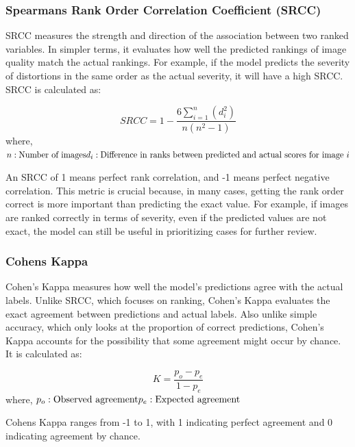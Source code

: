 \subsubsection{Spearmans Rank Order Correlation Coefficient (SRCC)}
\label{subsub:SRCC}
SRCC measures the strength and direction of the association between two ranked variables. In simpler terms, it evaluates how well the predicted rankings of image quality match the actual rankings. For example, if the model predicts the severity of distortions in the same order as the actual severity, it will have a high SRCC. SRCC is calculated as: \par
\begin{equation}
    SRCC = 1 - \frac{6 \sum_{i=1}^n (d_i^2)}{n(n^2 - 1)}
\end{equation}
\noindent
where, \newline
$n: \text{Number of images} \\ d_i: \text{Difference in ranks between predicted and actual scores for image } i$ \par
\vspace{\baselineskip}
\noindent
An SRCC of 1 means perfect rank correlation, and -1 means perfect negative correlation. This metric is crucial because, in many cases, getting the rank order correct is more important than predicting the exact value. For example, if images are ranked correctly in terms of severity, even if the predicted values are not exact, the model can still be useful in prioritizing cases for further review. \par
\subsubsection{Cohens Kappa}
\label{subsub:CohensKappa}
Cohen’s Kappa measures how well the model’s predictions agree with the actual labels. Unlike SRCC, which focuses on ranking, Cohen’s Kappa evaluates the exact agreement between predictions and actual labels. Also unlike simple accuracy, which only looks at the proportion of correct predictions, Cohen’s Kappa accounts for the possibility that some agreement might occur by chance. It is calculated as: \par
\begin{equation}
    K = \frac{p_o - p_e}{1 - p_e}
\end{equation}
\noindent
where, \newline
$p_o: \text{Observed agreement} \\ p_e: \text{Expected agreement}$ \par
\vspace{\baselineskip}
\noindent
Cohens Kappa ranges from -1 to 1, with 1 indicating perfect agreement and 0 indicating agreement by chance. \par

